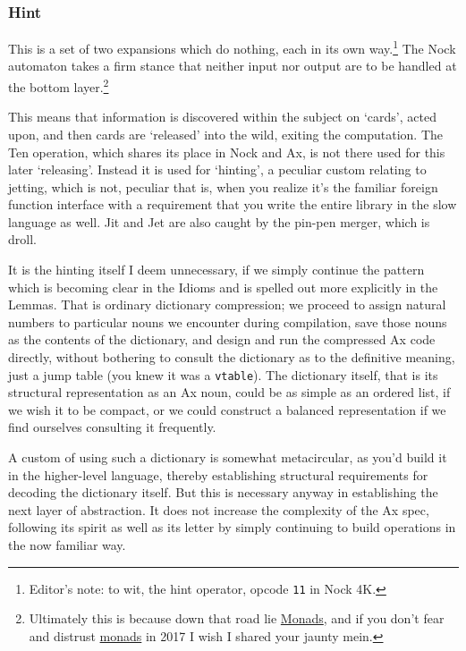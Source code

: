\documentclass[twoside]{article}
\begin{document}
\subsubsection{Hint}

This is a set of two expansions which do nothing, each in its own way.\footnote{Editor's note:  to wit, the hint operator, opcode \texttt{11} in Nock 4K.}  The Nock automaton takes a firm stance that neither input nor output are to be handled at the bottom layer.\footnote{Ultimately this is because down that road lie \href{https://wiki.haskell.org/Monad}{Monads}, and if you don't fear and distrust \href{https://en.wikipedia.org/wiki/Monad}{monads} in 2017 I wish I shared your jaunty mein.}

This means that information is discovered within the subject on `cards', acted upon, and then cards are `released' into the wild, exiting the computation. The Ten operation, which shares its place in Nock and Ax, is not there used for this later `releasing'. Instead it is used for `hinting', a peculiar custom relating to jetting, which is not, peculiar that is, when you realize it's the familiar foreign function interface with a requirement that you write the entire library in the slow language as well. Jit and Jet are also caught by the pin-pen merger, which is droll.

It is the hinting itself I deem unnecessary, if we simply continue the pattern which is becoming clear in the Idioms and is spelled out more explicitly in the Lemmas. That is ordinary dictionary compression; we proceed to assign natural numbers to particular nouns we encounter during compilation, save those nouns as the contents of the dictionary, and design and run the compressed Ax code directly, without bothering to consult the dictionary as to the definitive meaning, just a jump table (you knew it was a \texttt{vtable}). The dictionary itself, that is its structural representation as an Ax noun, could be as simple as an ordered list, if we wish it to be compact, or we could construct a balanced representation if we find ourselves consulting it frequently.

A custom of using such a dictionary is somewhat meta\-circular, as you'd build it in the higher-level language, thereby establishing structural requirements for decoding the dictionary itself. But this is necessary anyway in establishing the next layer of abstraction. It does not increase the complexity of the Ax spec, following its spirit as well as its letter by simply continuing to build operations in the now familiar way.
\end{document}
